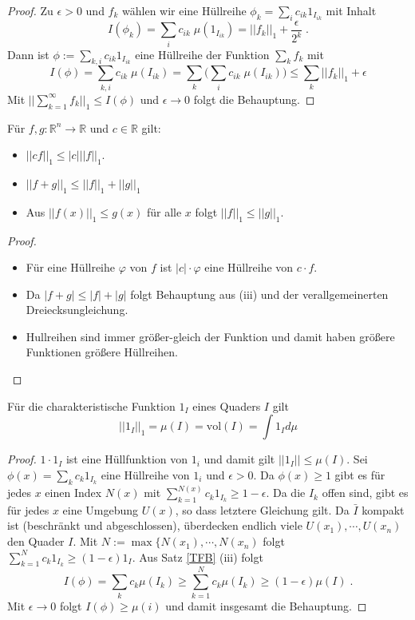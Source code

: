 \begin{proof}
Zu $\epsilon > 0$ und $f_k$ wählen wir eine Hüllreihe $\phi_k = \sum_{i} c_{ik} 1_{I_{ik}}$ mit Inhalt
$$ I(\phi_k) =  \sum_{i} c_{ik} \; \mu (1_{I_{ik}}) = || f_k||_1 + \frac{\epsilon}{2^k} \;.$$ Dann ist $\phi := \sum_{k,i} c_{ik} 1_{I_{ik}}$ eine Hüllreihe der Funktion $\sum_k f_k$ mit 
$$ I(\phi) = \sum_{k,i} c_{ik}  \; \mu (I_{ik}) = \sum_k \biggl( \sum_i  c_{ik} \; \mu (I_{ik})\biggr) \leq \sum_k || f_k ||_1 + \epsilon$$
Mit  $ \bigl | \bigl | \sum_{k=1}^{\infty} f_k \bigr | \bigr |_1 \leq I(\phi) $ und $\epsilon \to 0$ folgt die Behauptung.
\end{proof}

\begin{Bemerkung}[Rechenregeln]
Für $f,g : \mathbb{R}^n \to \mathbb{R}$ und $c \in \mathbb{R}$ gilt:
 \begin{itemize}
\item $|| cf ||_1 \leq |c| || f ||_1$. 
\item $|| f +g ||_1 \leq  ||f ||_1 + ||g||_1$
\item Aus $|| f (x)||_1 \leq g(x)$ für alle $x$ folgt $|| f ||_1 \leq || g ||_1$.
\end{itemize}
\end{Bemerkung}
\begin{proof}

 \begin{itemize}
\item Für eine Hüllreihe $\varphi$ von $f$ ist $|c| \cdot \varphi$ eine Hüllreihe von $c \cdot f$. 
\item  Da $|f +g | \leq | f | + | g |$ folgt Behauptung aus (iii) und der verallgemeinerten Dreiecksungleichung.
\item Hullreihen sind immer größer-gleich der Funktion und damit haben größere Funktionen größere Hüllreihen.
\end{itemize}
\end{proof}

\begin{Lemma}[Fundamentallemma]
Für die charakteristische Funktion $1_{I}$ eines Quaders $I$ gilt 
$$ || 1_I ||_1 = \mu(I) =  \text{vol} (I) = \int 1_I d \mu$$
\end{Lemma}
\begin{proof}
$ 1 \cdot 1_I$ ist eine Hüllfunktion von $1_i$ und damit gilt $|| 1_I || \leq \mu(I)$. 
Sei $\phi(x) = \sum_k c_k 1_{I_k} $ eine Hüllreihe von $1_i$ und $\epsilon >0$. Da $\phi(x) \geq 1$ gibt es für jedes $x$ einen Index $N(x)$ mit 
$\sum_{k=1}^{N(x)} c_k 1_{I_k} \geq 1 - \epsilon$. Da die $I_k$ offen sind, gibt es für jedes $x$ eine Umgebung $U(x)$, so dass letztere Gleichung gilt. Da $\bar{I}$ kompakt ist (beschränkt und abgeschlossen), überdecken endlich viele $U(x_1), \cdots , U(x_n)$ den Quader $I$. Mit $N:= \max \{ N(x_1), \cdots , N(x_n)$ folgt $\sum_{k=1}^N c_k 1_{I_k} \geq (1-\epsilon) 1_I$. Aus Satz \ref{TFB} (iii) folgt
$$ I (\phi) = \sum_k c_k \mu(I_k) \geq \sum_{k=1}^N c_k \mu (I_k) \geq (1 - \epsilon) \mu(I) \;.$$
Mit $\epsilon \to 0$ folgt $I (\phi) \geq \mu(i)$ und damit insgesamt die Behauptung.  
\end{proof}


